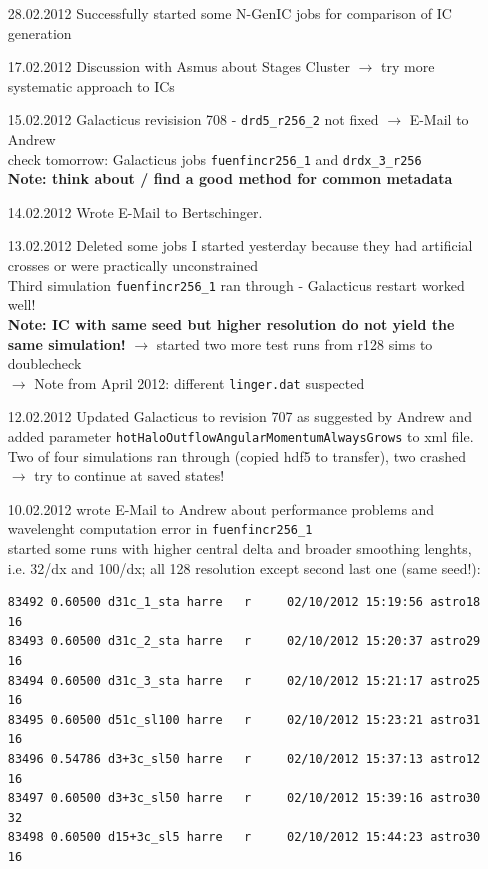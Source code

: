 \begin{itemize}
\item[28.02.2012]
Successfully started some N-GenIC jobs for comparison of IC generation \\

\item[17.02.2012]
Discussion with Asmus about Stages Cluster $\rightarrow$ try more systematic 
approach to ICs 

\item[15.02.2012]
Galacticus revisision 708 - \texttt{drd5\_r256\_2} not fixed 
$\rightarrow$ E-Mail to Andrew \\
check tomorrow: Galacticus jobs \texttt{fuenfincr256\_1} and 
\texttt{drdx\_3\_r256} \\
\textbf{Note: think about / find a good method for common metadata} \\

\item[14.02.2012]
Wrote E-Mail to Bertschinger. \\

\item[13.02.2012]
Deleted some jobs I started yesterday because they had artificial crosses 
or were practically unconstrained \\
Third simulation \texttt{fuenfincr256\_1} ran through - Galacticus 
restart worked well! \\
\textbf{Note: IC with same seed but higher resolution do not yield the same 
simulation!} $\rightarrow$ started two more test runs from r128 sims to doublecheck \\
$\rightarrow$ Note from April 2012: different \texttt{linger.dat} 
suspected

\item[12.02.2012]
Updated Galacticus to revision 707 as suggested by Andrew and added parameter 
\texttt{hotHaloOutflowAngularMomentumAlwaysGrows} to xml file. \\
Two of four simulations ran through (copied hdf5 to transfer), 
two crashed $\rightarrow$ try to continue at saved states!

\item[10.02.2012]
wrote E-Mail to Andrew about performance problems and wavelenght computation error 
in \texttt{fuenfincr256\_1} \\
started some runs with higher central delta and broader smoothing lenghts, i.e. 
32/dx and 100/dx; all 128 resolution except second last one (same seed!): 
\begin{verbatim}
83492 0.60500 d31c_1_sta harre   r     02/10/2012 15:19:56 astro18  16        
83493 0.60500 d31c_2_sta harre   r     02/10/2012 15:20:37 astro29  16        
83494 0.60500 d31c_3_sta harre   r     02/10/2012 15:21:17 astro25  16        
83495 0.60500 d51c_sl100 harre   r     02/10/2012 15:23:21 astro31  16  
83496 0.54786 d3+3c_sl50 harre   r     02/10/2012 15:37:13 astro12  16        
83497 0.60500 d3+3c_sl50 harre   r     02/10/2012 15:39:16 astro30  32  
83498 0.60500 d15+3c_sl5 harre   r     02/10/2012 15:44:23 astro30  16        
\end{verbatim}


\end{itemize}
